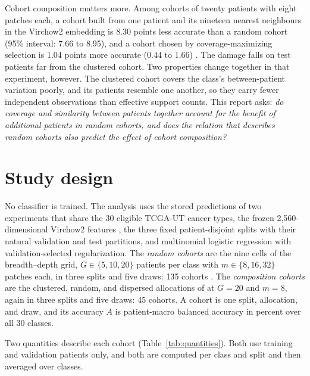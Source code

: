 \documentclass[11pt]{article}
\begin{document}
Cohort composition matters more. Among cohorts of twenty patients with eight patches each, a cohort built from one patient and its nineteen nearest neighbours in the Virchow2 embedding is 8.30 points less accurate than a random cohort (95\% interval: 7.66 to 8.95), and a cohort chosen by coverage-maximizing selection is 1.04 points more accurate (0.44 to 1.66) \citep{queisler2026cohortComposition}. The damage falls on test patients far from the clustered cohort. Two properties change together in that experiment, however. The clustered cohort covers the class's between-patient variation poorly, and its patients resemble one another, so they carry fewer independent observations than effective support counts. This report asks: \emph{do coverage and similarity between patients together account for the benefit of additional patients in random cohorts, and does the relation that describes random cohorts also predict the effect of cohort composition?}

\section{Study design}
\label{sec:design}
No classifier is trained. The analysis uses the stored predictions of two experiments that share the 30 eligible TCGA-UT cancer types, the frozen 2,560-dimensional Virchow2 features \citep{zimmermann2024virchow2}, the three fixed patient-disjoint splits with their natural validation and test partitions, and multinomial logistic regression with validation-selected regularization. The \emph{random cohorts} are the nine cells of the breadth--depth grid, $G\in\{5,10,20\}$ patients per class with $m\in\{8,16,32\}$ patches each, in three splits and five draws: 135 cohorts \citep{queisler2026effectiveSupport}. The \emph{composition cohorts} are the clustered, random, and dispersed allocations of \citet{queisler2026cohortComposition} at $G=20$ and $m=8$, again in three splits and five draws: 45 cohorts. A cohort is one split, allocation, and draw, and its accuracy $A$ is patient-macro balanced accuracy in percent over all 30 classes.

Two quantities describe each cohort (Table~\ref{tab:quantities}). Both use training and validation patients only, and both are computed per class and split and then averaged over classes.
\end{document}
